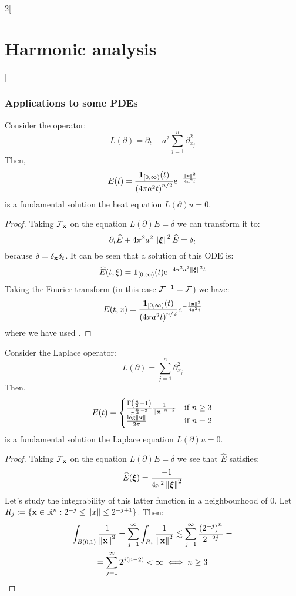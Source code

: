 \documentclass[../../../main_math.tex]{subfiles}
\begin{document}
\begin{multicols}{2}[\section{Harmonic analysis}]
  \subsubsection{Applications to some PDEs}
  \begin{proposition}\label{HA:heat}
    Consider the operator:
    $$
      L(\partial)=\partial_t-a^2\sum_{j=1}^{n}\partial_{x_j}^2
    $$
    Then, $$
      E(t)=\frac{\boldsymbol{\mathrm{1}}_{[0,\infty)}(t)}{{(4\pi a^2t)}^{n/2}}\mathrm{e}^{-\frac{\left\|\boldsymbol{\mathrm{x}}\right\|^2}{4a^2t}}
    $$
    is a fundamental solution the heat equation $L(\partial)u=0$.
  \end{proposition}
  \begin{proof}
    Taking $\mathcal{F}_{\boldsymbol{\mathrm{x}}}$ on the equation $L(\partial) E=\delta$ we can transform it to:
    $$
      \partial_t \widehat{E}+4\pi^2a^2\left\|\boldsymbol{\mathrm{\xi}}\right\|^2\widehat{E}=\delta_t
    $$
    because $\delta=\delta_{\boldsymbol{\mathrm{x}}}\delta_t$. It can be seen that a solution of this ODE is:
    $$
      \widehat{E}(t,\xi)=\boldsymbol{\mathrm{1}}_{[0,\infty)}(t)\mathrm{e}^{-4\pi^2a^2\left\|\boldsymbol{\mathrm{\xi}}\right\|^2t}
    $$
    Taking the Fourier transform (in this case $\mathcal{F}^{-1}=\mathcal{F}$) we have:
    $$
      E(t,x)=\frac{\boldsymbol{\mathrm{1}}_{[0,\infty)}(t)}{{(4\pi a^2t)}^{n/2}}e^{-\frac{\left\|\boldsymbol{\mathrm{x}}\right\|^2}{4a^2t}}
    $$
    where we have used .
  \end{proof}
  \begin{proposition}
    Consider the Laplace operator:
    $$
      L(\partial)=\sum_{j=1}^{n}\partial_{x_j}^2
    $$
    Then, $$
      E(t)=\begin{cases}
        \frac{\Gamma\left(\frac{n}{2}-1\right)}{\pi^{\frac{n}{2}-2}}\frac{1}{\left\|\boldsymbol{\mathrm{x}}\right\|^{n-2}} & \text{if }n\geq 3 \\
        \frac{\log\left\|\boldsymbol{\mathrm{x}}\right\|}{2\pi}                                                            & \text{if }n=2     \\
      \end{cases}
    $$
    is a fundamental solution the Laplace equation $L(\partial)u=0$.
  \end{proposition}
  \begin{proof}
    Taking $\mathcal{F}_{\boldsymbol{\mathrm{x}}}$ on the equation $L(\partial) E=\delta$ we see that $\widehat{E}$ satisfies:
    $$
      \widehat{E}(\boldsymbol{\mathrm{\xi}}) = \frac{-1}{4\pi^2\left\|\boldsymbol{\mathrm{\xi}}\right\|^2}
    $$
    Let's study the integrability of this latter function in a neighbourhood of $0$. Let $R_j:=\{\boldsymbol{\mathrm{x}}\in\mathbb{R}^n:2^{-j}\leq \left\|x\right\|\leq 2^{-j+1}\}$. Then:
    \begin{multline*}
      \int_{B(0,1)}\frac{1}{\norm{\vf{x}}^2}=\sum_{j=1}^{\infty}\int_{R_j} \frac{1}{\norm{\vf{x}}^2}\lesssim \sum_{j=1}^{\infty}\frac{{(2^{-j})}^n}{2^{-2j}}=\\= \sum_{j=1}^{\infty}2^{j(n-2)}<\infty\iff n\geq 3

\end{multline*}
\end{proof}
\end{multicols}
\end{document}
